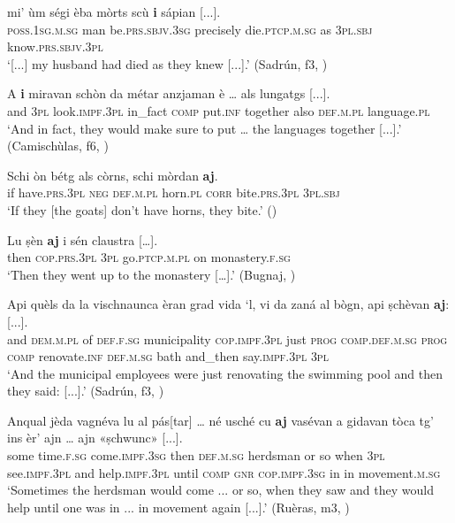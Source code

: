 \ea
\label{ex:aj:2}
\gll  [...] mi' ùm ségi èba mòrts scù \textbf{i} sápian [...].\\
{} \textsc{poss.1sg.m.sg} man be.\textsc{prs.sbjv.3sg} precisely die.\textsc{ptcp.m.sg} as \textsc{3pl.sbj} know.\textsc{prs.sbjv.3pl}\\
\glt `[...] my husband had died as they knew [...].' (Sadrún, f3, )
\z

\ea
\label{ex:aj:2b}
\gll    A \textbf{i} miravan schòn da métar anzjaman è … als lungatgs [...].\\
and \textsc{3pl} look.\textsc{impf.3pl} in\_fact \textsc{comp} put.\textsc{inf} together also {} \textsc{def.m.pl} language.\textsc{pl}\\
\glt `And in fact, they would make sure to put … the languages together [...].' (Camischùlas, f6, )
\z

\ea
\label{ex:aj:3}
\gll  Schi òn bétg als còrns, schi mòrdan \textbf{aj}.  \\
     if have.\textsc{prs.3pl} \textsc{neg} \textsc{def.m.pl} horn.\textsc{pl} \textsc{corr} bite.\textsc{prs.3pl} \textsc{3pl.sbj}\\
\glt `If they [the goats] don’t have horns, they bite.' ()
\z

\ea
\label{ex:aj:4}
\gll Lu ṣèn \textbf{aj} i sén claustra […].\\
then \textsc{cop.prs.3pl} \textsc{3pl}  go.\textsc{ptcp.m.pl} on monastery.\textsc{f.sg}\\
\glt `Then they went up to the monastery […].' (Bugnaj, \citealt[136]{Büchli1966})
\z

\ea
\label{ex:aj:5}
\gll  Api quèls da la vischnaunca èran grad vida `l, vi da zaná al bògn, api ṣchèvan \textbf{aj}: [...]. \\
and \textsc{dem.m.pl} of \textsc{def.f.sg} municipality \textsc{cop.impf.3pl} just \textsc{prog} \textsc{comp.def.m.sg} \textsc{prog} \textsc{comp} renovate.\textsc{inf} \textsc{def.m.sg} bath and\_then say.\textsc{impf.3pl} \textsc{3pl} \\
\glt `And the municipal employees were just renovating the swimming pool and then they said: [...].' (Sadrún, f3, )
\z

\ea
\label{ex:aj:7}
\gll  Anqual jèda vagnéva lu al pás[tar] … né usché cu \textbf{aj} vasévan a gidavan tòca tg’ ins èr’ ajn … ajn «ṣchwunc»\footnotemark{} [...].\\
some time.\textsc{f.sg} come.\textsc{impf.3sg} then \textsc{def.m.sg} herdsman {} or so when \textsc{3pl} see.\textsc{impf.3pl} and help.\textsc{impf.3pl} until \textsc{comp} \textsc{gnr} \textsc{cop.impf.3sg} in {} in movement.\textsc{m.sg}\\
\glt `Sometimes the herdsman would come ... or so, when they saw and they would help until one was in ... in movement again [...].' (Ruèras, m3, )
\z


